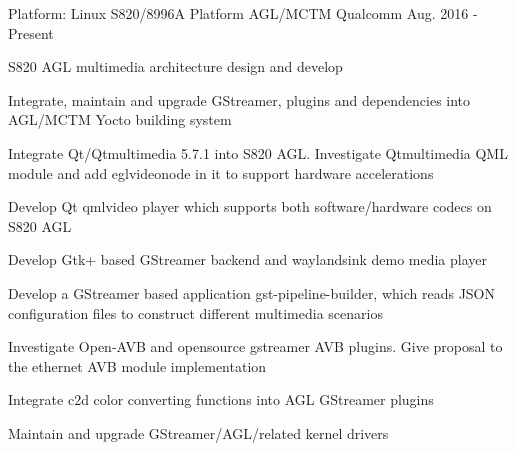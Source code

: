 

\begin{cventries}

  \cventry
    {Platform: Linux} %
    {S820/8996A Platform AGL/MCTM} %
    {Qualcomm} %
    {Aug. 2016 - Present} %
    {
      \begin{cvitems} %
        \item {S820 AGL multimedia architecture design and develop}
        \item {Integrate, maintain and upgrade GStreamer, plugins and dependencies into AGL/MCTM Yocto building system}
        \item {Integrate Qt/Qtmultimedia 5.7.1 into S820 AGL. Investigate Qtmultimedia QML module and add eglvideonode in it to support hardware accelerations}
		\item {Develop Qt qmlvideo player which supports both software/hardware codecs on S820 AGL}
		\item {Develop Gtk+ based GStreamer backend and waylandsink demo media player}
        \item {Develop a GStreamer based application gst-pipeline-builder, which reads JSON configuration files to  construct different multimedia scenarios}
        \item {Investigate Open-AVB and opensource gstreamer AVB plugins. Give proposal to the ethernet AVB module implementation}
		\item {Integrate c2d color converting functions into AGL GStreamer plugins}
		\item {Maintain and upgrade GStreamer/AGL/related kernel drivers}
      \end{cvitems}
    }


\end{cventries}
